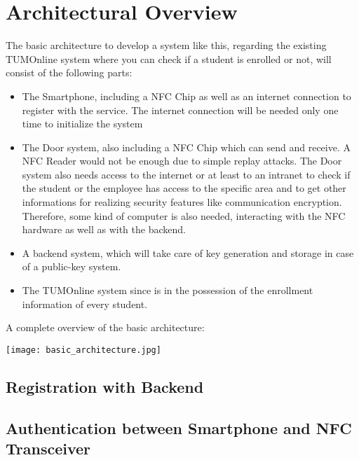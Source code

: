 \section{Architectural Overview}\label{sec:arch}

The basic architecture to develop a system like this, regarding the existing TUMOnline system where you can check if a student is enrolled or not, will consist of the following parts:

\begin{itemize}
\item The Smartphone, including a NFC Chip as well as an internet connection to register with the service. The internet connection will be needed only one time to initialize the system
\item The Door system, also including a NFC Chip which can send and receive. A NFC Reader would not be enough due to simple replay attacks. The Door system also needs access to the internet or at least to an intranet to check if the student or the employee has access to the specific area and to get other informations for realizing security features like communication encryption. Therefore, some kind of computer is also needed, interacting with the NFC hardware as well as with the backend.
\item A backend system, which will take care of key generation and storage in case of a public-key system.

\item The TUMOnline system since is in the possession of the enrollment information of every student.
\end{itemize} 
 
 A complete overview of the basic architecture: \newline
 \begin{center}
 \texttt{[image: basic\_architecture.jpg]}
\end{center}


\subsection{Registration with Backend}

\subsection{Authentication between Smartphone and NFC Transceiver}